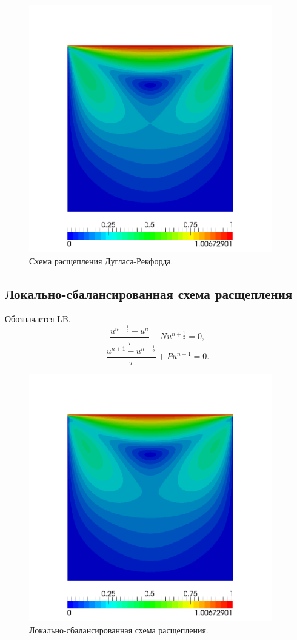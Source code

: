 \documentclass[12pt]{article}
\begin{document}
\begin{figure}
	\begin{center}
		\includegraphics[width=400px]{pics/dr}
		\caption{Схема расщепления Дугласа-Рекфорда.}
		\label{fg:velocity-dr}
	\end{center}
\end{figure}

\subsection{Локально-сбалансированная схема расщепления}
Обозначается LB.
\begin{equation}
\frac{u^{n+\frac{1}{2}}-u^n}{\tau} + Nu^{n+\frac{1}{2}}=0,
\end{equation}
\begin{equation}
\frac{u^{n+1}-u^{n+\frac{1}{2}}}{\tau} + Pu^{n+1}=0.
\end{equation}
\begin{figure}
	\begin{center}
		\includegraphics[width=400px]{pics/lb}
		\caption{Локально-сбалансированная схема расщепления.}
		\label{fg:velocity-lb}
	\end{center}
\end{figure}
\end{document}
